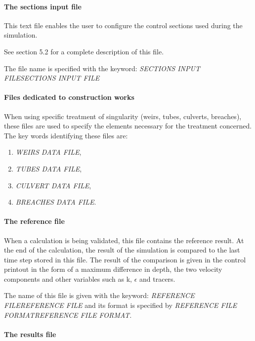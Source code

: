 \documentclass{article} %
\begin{document}
\paragraph{ The sections input file}

 This text file enables the user to configure the control sections used during the simulation.

 See section 5.2 for a complete description of this file.

 The file name is specified with the keyword: \textit{SECTIONS INPUT FILESECTIONS INPUT FILE}


\paragraph{ Files dedicated to construction works}

 When using specific treatment of singularity (weirs, tubes, culverts, breaches), these files are used to specify the elements necessary for the treatment concerned. The key words identifying these files are:

\begin{enumerate}
\item  \textit{WEIRS DATA FILE},

\item  \textit{TUBES DATA FILE},

\item  \textit{CULVERT DATA FILE},

\item  \textit{BREACHES DATA FILE}.
\end{enumerate}


\paragraph{ The reference file}

 When a calculation is being validated, this file contains the reference result. At the end of the calculation, the result of the simulation is compared to the last time step stored in this file. The result of the comparison is given in the control printout in the form of a maximum difference in depth, the two velocity components and other variables such as k, $\epsilon$ and tracers.

 The name of this file is given with the keyword: \textit{REFERENCE FILEREFERENCE FILE} and its format is specified by \textit{REFERENCE FILE FORMATREFERENCE FILE FORMAT.}


\paragraph{ The results file}
\end{document}
